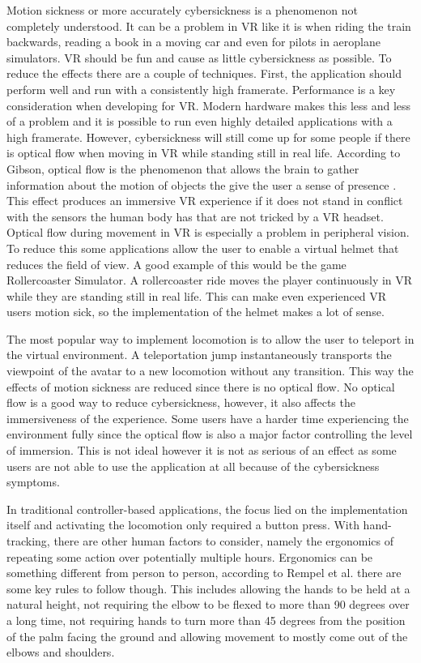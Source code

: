 Motion sickness or more accurately cybersickness is a phenomenon not completely understood. It can be a problem in VR like it is when riding the train backwards, reading a book in a moving car and even for pilots in aeroplane simulators. VR should be fun and cause as little cybersickness as possible. To reduce the effects there are a couple of techniques. First, the application should perform well and run with a consistently high framerate. Performance is a key consideration when developing for VR. Modern hardware makes this less and less of a problem and it is possible to run even highly detailed applications with a high framerate. However, cybersickness will still come up for some people if there is optical flow when moving in VR while standing still in real life. According to Gibson, optical flow is the phenomenon that allows the brain to gather information about the motion of objects the give the user a sense of presence \cite{Gibson}. This effect produces an immersive VR experience if it does not stand in conflict with the sensors the human body has that are not tricked by a VR headset. Optical flow during movement in VR is especially a problem in peripheral vision. To reduce this some applications allow the user to enable a virtual helmet that reduces the field of view. A good example of this would be the game Rollercoaster Simulator. A rollercoaster ride moves the player continuously in VR while they are standing still in real life. This can make even experienced VR users motion sick, so the implementation of the helmet makes a lot of sense. 

The most popular way to implement locomotion is to allow the user to teleport in the virtual environment. A teleportation jump instantaneously transports the viewpoint of the avatar to a new locomotion without any transition. This way the effects of motion sickness are reduced since there is no optical flow. No optical flow is a good way to reduce cybersickness, however, it also affects the immersiveness of the experience. Some users have a harder time experiencing the environment fully since the optical flow is also a major factor controlling the level of immersion. This is not ideal however it is not as serious of an effect as some users are not able to use the application at all because of the cybersickness symptoms. 

In traditional controller-based applications, the focus lied on the implementation itself and activating the locomotion only required a button press. With hand-tracking, there are other human factors to consider, namely the ergonomics of repeating some action over potentially multiple hours. Ergonomics can be something different from person to person, according to Rempel et al. \cite{Rempel2014} there are some key rules to follow though. This includes allowing the hands to be held at a natural height, not requiring the elbow to be flexed to more than 90 degrees over a long time, not requiring hands to turn more than 45 degrees from the position of the palm facing the ground and allowing movement to mostly come out of the elbows and shoulders. 



